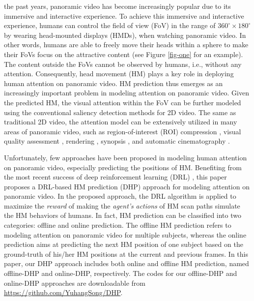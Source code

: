 \documentclass[10pt,journal,compsoc]{IEEEtran}
\begin{document}
%
%
%
%
 the past years, panoramic video \cite{neumann2000immersive} has become increasingly popular due to its immersive and interactive experience.
To achieve this immersive and interactive experience, humans can control the field of view (FoV)  in the range of $360^{\circ} \times 180^{\circ}$ by wearing head-mounted displays (HMDs), when watching panoramic video.
In other words, humans are able to freely move their heads within a sphere to make their FoVs focus on the attractive content (see Figure \ref{fig-one} for an example).
The content outside the FoVs cannot be observed by humans, i.e., without any attention.
Consequently, head movement (HM) plays a key role in deploying human attention on panoramic video.
HM prediction thus emerges as an increasingly important problem in modeling attention on panoramic video.
Given the predicted HM, the visual attention within the FoV can be further modeled using the conventional saliency detection methods \cite{borji2013state} for 2D video.
The same as traditional 2D video, the attention model can be extensively utilized in many areas of panoramic video, such as region-of-interest (ROI) compression \cite{de2016video}, visual quality assessment \cite{gaddam2016tiling, Xu17}, rendering \cite{stengel2016gaze}, synopsis \cite{Pritch08}, and automatic cinematography \cite{su2016pano2vid}.

Unfortunately, few approaches have been proposed in modeling human attention on panoramic video, especially predicting the positions of HM.
Benefiting from the most recent success of deep reinforcement learning (DRL) \cite{mnih2016asynchronous}, this paper proposes a DRL-based HM prediction (DHP) approach for modeling attention on panoramic video.
In the proposed approach, the DRL algorithm is applied to maximize the \textit{reward} of making the \textit{agent's} \textit{actions} of HM scan paths simulate the HM behaviors of humans.
In fact, HM prediction can be classified into two categories: offline and online prediction.
The offline HM prediction refers to modeling attention on panoramic video for multiple subjects, whereas the online prediction aims at predicting the next HM position of one subject based on the ground-truth of his/her HM positions at the current and previous frames. In this paper, our DHP approach includes both online and offline HM prediction, named offline-DHP and online-DHP, respectively.
The codes for our offline-DHP and online-DHP approaches are downloadable from \url{https://github.com/YuhangSong/DHP}.
\end{document}
